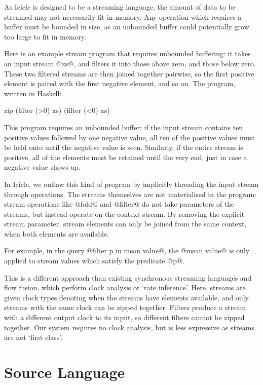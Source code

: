 As Icicle is designed to be a streaming language, the amount of data to be streamed may not necessarily fit in memory.
Any operation which requires a buffer must be bounded in size, as an unbounded buffer could potentially grow too large to fit in memory.

Here is an example stream program that requires unbounded buffering:
it takes an input stream @xs@, and filters it into those above zero, and those below zero.
These two filtered streams are then joined together pairwise, so the first positive element is paired with the first negative element, and so on.
The program, written in Haskell:

\begin{code}
zip (filter (>0) xs) (filter (<0) xs)
\end{code}

This program requires an unbounded buffer: if the input stream contains ten positive values followed by one negative value, all ten of the positive values must be held onto until the negative value is seen.
Similarly, if the entire stream is positive, all of the elements must be retained until the very end, just in case a negative value shows up.

In Icicle, we outlaw this kind of program by implicitly threading the input stream through operations.
The streams themselves are not materialised in the program: stream operations like @fold@ and @filter@ do not take parameters of the streams, but instead operate on the context stream.
By removing the explicit stream parameter, stream elements can only be joined from the same context, when both elements are available.

For example, in the query @filter p in mean value@, the @mean value@ is only applied to stream values which satisfy the predicate @p@.

This is a different approach than existing synchronous streaming languages\cite{mandel2010lucy} and flow fusion\cite{lippmeier2013data}, which perform clock analysis or `rate inference'.
Here, streams are given clock types denoting when the streams have elements available, and only streams with the same clock can be zipped together.
Filters produce a stream with a different output clock to its input, so different filters cannot be zipped together.
Our system requires no clock analysis, but is less expressive as streams are not `first class'.


\eject
\section{Source Language}
\label{s:IcicleSource}

